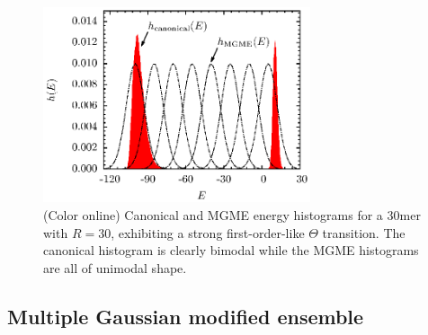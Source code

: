 \documentclass[12pt]{report}
\begin{document}
%
\begin{figure}
\center
\includegraphics[width = 0.7\textwidth]{chapter3Figs/mgme.eps}
\caption{\label{fig:Fig_9}%
(Color online) Canonical and MGME energy histograms for a 30mer
with $R=30$, exhibiting a
strong first-order-like $\Theta$ transition. The canonical histogram is
clearly
bimodal while the MGME histograms are all of unimodal shape.}
\end{figure} 
%  
\subsection{Multiple Gaussian modified ensemble}
\end{document}
